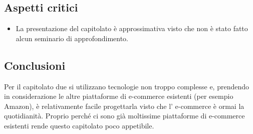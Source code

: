 \subsection{Aspetti critici}
\begin{itemize}
\item	La presentazione del capitolato è approssimativa visto che non è stato fatto alcun seminario di approfondimento.
\end{itemize}
\subsection{Conclusioni}
Per il capitolato due si utilizzano tecnologie non troppo complesse e, prendendo in considerazione le altre piattaforme di e-commerce esistenti (per esempio Amazon), è relativamente facile progettarla visto che l' e-commerce è ormai la quotidianità. Proprio perché ci sono già moltissime piattaforme di e-commerce esistenti rende questo capitolato poco appetibile.
